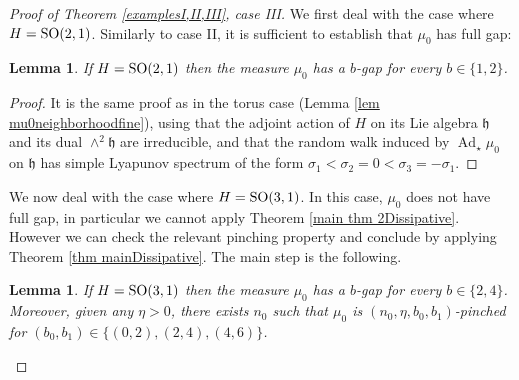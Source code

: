 \documentclass[11pt, leqno, fleqn]{amsart}
\def\SO{   {\rm SO}}
\newtheorem{lemma}[thm]{\bf Lemma}
\theoremstyle{definition}
\theoremstyle{definition}
\DeclareMathOperator{\Ad}{Ad}
\begin{document}
	
	\begin{proof}[Proof of Theorem \ref{examplesI,II,III}, case III]
		
		We first deal with the case where $H=\SO(2,1)$. Similarly to  case II, it is sufficient to establish that $\mu_{0}$ has full gap: 
		
		\begin{lemma} If $H=\SO(2,1)$  then
			the measure $\mu_{0}$ has a $b$-gap for every $b\in \{1, 2\}$.					\end{lemma}	
		\begin{proof}
			It is the same proof as in the torus case (Lemma  \ref{lem mu0neighborhoodfine}), using that the adjoint action of $H$ on its Lie algebra $\mathfrak h$ and its dual  $\wedge^2\mathfrak{h}$ are irreducible, and that the random walk induced by $\Ad_{\star}\mu_{0}$ on $\mathfrak h$ has simple Lyapunov spectrum of the form $\sigma_{1}<\sigma_{2}=0<\sigma_{3}=-\sigma_{1}$.
		\end{proof}
		
		
	We now deal with the case where $H=\SO(3,1)$. In this case, $\mu_{0}$ does not have full gap, in particular we cannot apply Theorem  \ref{main thm 2Dissipative}. However  we can check the relevant pinching property and conclude by applying Theorem  \ref{thm mainDissipative}. The main step is the following.
		
		\begin{lemma}\label{caseSO(3,1)-gapinching}
		 If $H=\SO(3,1)$  then
			the measure $\mu_{0}$ has a $b$-gap for every $b\in \{2, 4\}$. Moreover, given any $\eta>0$, there exists $n_{0}$ such that $\mu_{0}$  is $(n_{0}, \eta, b_{0},b_{1})$-pinched for $(b_{0},b_{1})\in \{(0, 2), (2, 4), (4,6)\}$.					
		\end{lemma}
		

\end{proof}
\end{document}
